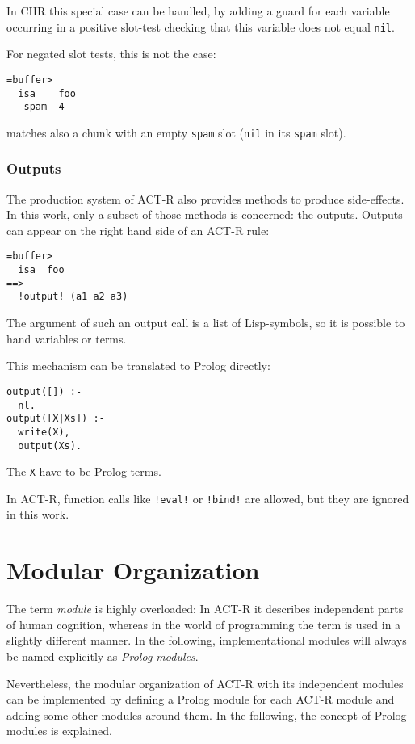 In CHR this special case can be handled, by adding a guard for each variable occurring in a positive slot-test checking that this variable does not equal \verb|nil|.

For negated slot tests, this is not the case: 

\begin{lstlisting}
=buffer>
  isa    foo
  -spam  4
\end{lstlisting}

matches also a chunk with an empty \verb|spam| slot (\verb|nil| in its \verb|spam| slot).



\subsubsection{Outputs}

The production system of ACT-R also provides methods to produce side-effects. In this work, only a subset of those methods is concerned: the outputs. Outputs can appear on the right hand side of an ACT-R rule:

\begin{lstlisting}
=buffer>
  isa  foo
==>
  !output! (a1 a2 a3)
\end{lstlisting}

The argument of such an output call is a list of Lisp-symbols, so it is possible to hand variables or terms.

This mechanism can be translated to Prolog directly:

\begin{lstlisting}
output([]) :-
  nl.
output([X|Xs]) :-
  write(X),
  output(Xs).
\end{lstlisting}

The \verb|X| have to be Prolog terms.

In ACT-R, function calls like \verb|!eval!| or \verb|!bind!| are allowed, but they are ignored in this work.

\section{Modular Organization}

The term \emph{module} is highly overloaded: In ACT-R it describes independent parts of human cognition, whereas in the world of programming the term is used in a slightly different manner. In the following, implementational modules will always be named explicitly as \emph{Prolog modules}.

Nevertheless, the modular organization of ACT-R with its independent modules can be implemented by defining a Prolog module for each ACT-R module and adding some other modules around them. In the following, the concept of Prolog modules is explained.

